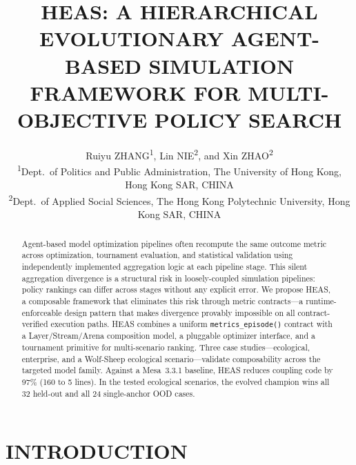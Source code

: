 \documentclass{wscpaperproc}
\begin{document}

\title{HEAS: A HIERARCHICAL EVOLUTIONARY AGENT-BASED SIMULATION FRAMEWORK
       FOR MULTI-OBJECTIVE POLICY SEARCH}

\author{\begin{center}Ruiyu ZHANG\textsuperscript{1}, Lin NIE\textsuperscript{2}, and Xin ZHAO\textsuperscript{2}\\
[11pt]
\textsuperscript{1}Dept.~of Politics and Public Administration, The University of Hong Kong, Hong Kong SAR, CHINA\\
\textsuperscript{2}Dept.~of Applied Social Sciences, The Hong Kong Polytechnic University, Hong Kong SAR, CHINA\end{center}
}

\maketitle

\vspace{-12pt}

\begin{abstract}
Agent-based model optimization pipelines often recompute the same outcome metric
across optimization, tournament evaluation, and statistical validation using
independently implemented aggregation logic at each pipeline stage. This silent aggregation divergence is a structural
risk in loosely-coupled simulation pipelines: policy rankings can differ across
stages without any explicit error. We propose HEAS, a composable framework that
eliminates this risk through metric contracts---a runtime-enforceable design
pattern that makes divergence provably impossible on all contract-verified
execution paths. HEAS combines a uniform \texttt{metrics\_episode()} contract
with a Layer/Stream/Arena composition model, a pluggable optimizer interface,
and a tournament primitive for multi-scenario ranking. Three case
studies---ecological, enterprise, and a Wolf-Sheep ecological scenario---validate
composability across the targeted model family. Against a Mesa~3.3.1 baseline,
HEAS reduces coupling code by 97\% (160 to 5 lines). In the tested ecological
scenarios, the evolved champion wins all 32 held-out and all 24 single-anchor
OOD cases.
\end{abstract}

\section{INTRODUCTION}
\end{document}
